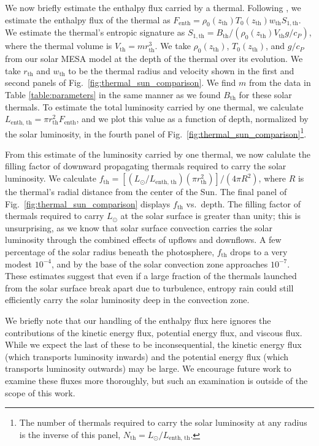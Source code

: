 We now briefly estimate the enthalpy flux carried by a thermal.
Following \citet{brandenburg2016}, we estimate the enthalpy flux of the thermal as $F_{\text{enth}} = \rho_0(z_{\text{th}}) T_0(z_{\text{th}}) w_{\text{th}} S_{1,\text{th}}$.
We estimate the thermal's entropic signature as $S_{1, \text{th}} = B_{\text{th}}/(\rho_0(z_{\text{th}}) V_{\text{th}} g/c_P)$, where the thermal volume is $V_{\text{th}} = m r_{\text{th}}^3$.
We take $\rho_0(z_{\text{th}})$, $T_0(z_{\text{th}})$, and $g/c_P$ from our solar MESA model at the depth of the thermal over its evolution.
We take $r_{\text{th}}$ and $w_{\text{th}}$ to be the thermal radius and velocity shown in the first and second panels of Fig.~\ref{fig:thermal_sun_comparison}.
We find $m$ from the data in Table \ref{table:parameters} in the same manner as we found $B_{\text{th}}$ for these solar thermals.
To estimate the total luminosity carried by one thermal, we calculate $L_{\text{enth, th}} = \pi r_{\text{th}}^2 F_{\text{enth}}$, and we plot this value as a function of depth, normalized by the solar luminosity, in the fourth panel of Fig.~\ref{fig:thermal_sun_comparison}\footnote{The number of thermals required to carry the solar luminosity at any radius is the inverse of this panel, $N_{\text{th}} = L_\odot/L_{\text{enth, th}}$.}.

From this estimate of the luminosity carried by one thermal, we now calulate the filling factor of downward propagating thermals required to carry the solar luminosity.
We calculate $f_{\text{th}} = [(L_{\odot}/L_{\text{enth, th}}) (\pi r_{\text{th}}^2)]/(4\pi R^2)$, where $R$ is the thermal's radial distance from the center of the Sun.
The final panel of Fig.~\ref{fig:thermal_sun_comparison} displays $f_{\text{th}}$ vs.~depth.
The filling factor of thermals required to carry $L_\odot$ at the solar surface is greater than unity; this is unsurprising, as we know that solar surface convection carries the solar luminosity through the combined effects of upflows and downflows.
A few percentage of the solar radius beneath the photosphere, $f_{\text{th}}$ drops to a very modest $10^{-4}$, and by the base of the solar convection zone approaches $10^{-7}$.
These estimates suggest that even if a large fraction of the thermals launched from the solar surface break apart due to turbulence, entropy rain could still efficiently carry the solar luminosity deep in the convection zone.

We briefly note that our handling of the enthalpy flux here ignores the contributions of the kinetic energy flux, potential energy flux, and viscous flux.
While we expect the last of these to be inconsequential, the kinetic energy flux (which transports luminosity inwards) and the potential energy flux (which transports luminosity outwards) may be large.
We encourage future work to examine these fluxes more thoroughly, but such an examination is outside of the scope of this work.

